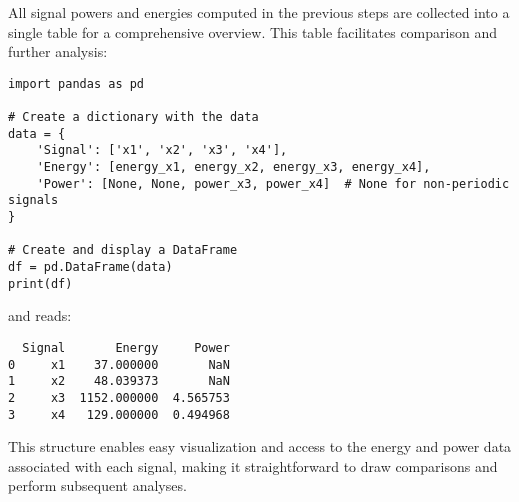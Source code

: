 
\item[(f)]
All signal powers and energies computed in the previous steps are collected into a single table for a comprehensive overview.
This table facilitates comparison and further analysis:

\begin{verbatim}
import pandas as pd

# Create a dictionary with the data
data = {
    'Signal': ['x1', 'x2', 'x3', 'x4'],
    'Energy': [energy_x1, energy_x2, energy_x3, energy_x4],
    'Power': [None, None, power_x3, power_x4]  # None for non-periodic signals
}

# Create and display a DataFrame
df = pd.DataFrame(data)
print(df)
\end{verbatim}

and reads:

\begin{verbatim}
  Signal       Energy     Power
0     x1    37.000000       NaN
1     x2    48.039373       NaN
2     x3  1152.000000  4.565753
3     x4   129.000000  0.494968
\end{verbatim}

This structure enables easy visualization and access to the energy and power data associated with each signal, making it straightforward to draw comparisons and perform subsequent analyses.
